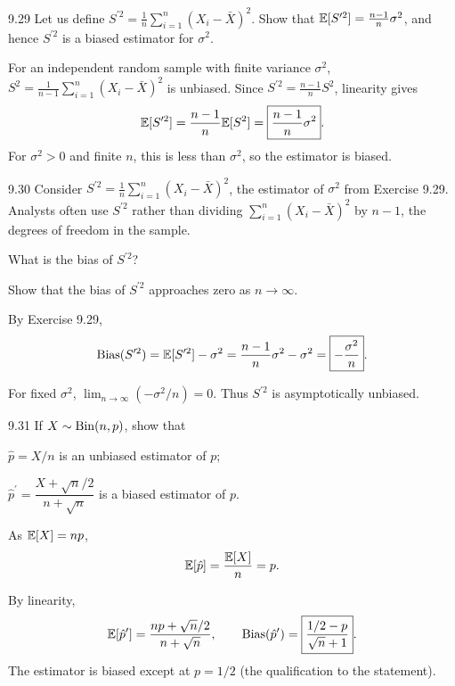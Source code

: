 \documentclass[11pt,oneside]{article}
\begin{document}
\begin{exercise}{9.29}
Let us define $S^{\prime 2}=\frac1n\sum_{i=1}^n(X_i-\bar X)^2$. Show that $\mathbb{E}[S^{\prime 2}]=\frac{n-1}{n}\sigma^2$, and hence $S^{\prime 2}$ is a biased estimator for $\sigma^2$.
\end{exercise}
\begin{solution}
For an independent random sample with finite variance $\sigma^2$, $S^2=\frac1{n-1}\sum_{i=1}^n(X_i-\bar X)^2$ is unbiased. Since $S^{\prime 2}=\frac{n-1}{n}S^2$, linearity gives
\[
\mathbb{E}[S^{\prime 2}]=\frac{n-1}{n}\mathbb{E}[S^2]=\boxed{\frac{n-1}{n}\sigma^2}.
\]
For $\sigma^2>0$ and finite $n$, this is less than $\sigma^2$, so the estimator is biased.
\end{solution}

\begin{exercise}{9.30}
Consider $S^{\prime 2}=\frac1n\sum_{i=1}^n(X_i-\bar X)^2$, the estimator of $\sigma^2$ from Exercise 9.29. Analysts often use $S^{\prime 2}$ rather than dividing $\sum_{i=1}^n(X_i-\bar X)^2$ by $n-1$, the degrees of freedom in the sample.
\begin{exercisesubparts}
\item What is the bias of $S^{\prime 2}$?
\item Show that the bias of $S^{\prime 2}$ approaches zero as $n\to\infty$.
\end{exercisesubparts}
\end{exercise}
\begin{solution}
\begin{exercisesubparts}
\item By Exercise 9.29,
\[
\operatorname{Bias}(S^{\prime 2})=\mathbb{E}[S^{\prime 2}]-\sigma^2=\frac{n-1}{n}\sigma^2-\sigma^2=\boxed{-\frac{\sigma^2}{n}}.
\]

\item For fixed $\sigma^2$, $\displaystyle\lim_{n\to\infty}(-\sigma^2/n)=0$. Thus $S^{\prime 2}$ is asymptotically unbiased.
\end{exercisesubparts}
\end{solution}

\begin{exercise}{9.31}
If $X\sim\operatorname{Bin}(n,p)$, show that
\begin{exercisesubparts}
\item $\hat p=X/n$ is an unbiased estimator of $p$;
\item $\hat p^{\prime}=\dfrac{X+\sqrt n/2}{n+\sqrt n}$ is a biased estimator of $p$.
\end{exercisesubparts}
\end{exercise}
\begin{solution}
\begin{exercisesubparts}
\item As $\mathbb{E}[X]=np$,
\[
\mathbb{E}[\hat p]=\frac{\mathbb{E}[X]}{n}=p.
\]

\item By linearity,
\[
\mathbb{E}[\hat p^{\prime}]=\frac{np+\sqrt n/2}{n+\sqrt n},\qquad\operatorname{Bias}(\hat p^{\prime})=\boxed{\frac{1/2-p}{\sqrt n+1}}.
\]
The estimator is biased except at $p=1/2$ (the qualification to the statement).
\end{exercisesubparts}
\end{solution}
\end{document}
